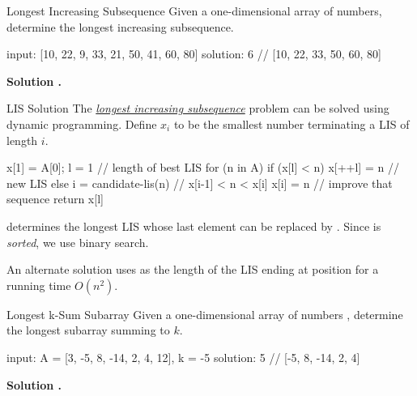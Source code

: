 \documentclass{cognito}
\begin{document}
\begin{note}{Longest Increasing Subsequence}
	Given a one-dimensional array of numbers, determine the longest increasing subsequence.
	\begin{largecode}
 input: [10, 22, 9, 33, 21, 50, 41, 60, 80]
 solution: 6  // [10, 22, 33, 50, 60, 80]
	\end{largecode}	
	
	\bf Solution \hyperref[note:LIS Solution]{\solutionref}.
\end{note}

\begin{note}{LIS Solution}
	The \hyperref[note:Longest Increasing Subsequence]{\it longest increasing subsequence} problem can be solved
	using dynamic programming. Define $x_i$ to be the smallest number terminating a LIS of length $i$.
	\begin{largecode}
 x[1] = A[0];  l = 1          // length of best LIS
 for (n in A)
 	if (x[l] < n) x[++l] = n  // new LIS
	else
		i = candidate-lis(n)  // x[i-1] < n < x[i]
		x[i] = n              // improve that sequence
 return x[l]
	\end{largecode}
	 determines the longest LIS whose last element can be replaced by .
	Since  is \emph{sorted}, we use binary search.
	\begin{remark} An alternate solution uses  as the length of the LIS ending at position  for a running time $O(n^2)$.\end{remark} \vspace{-5pt}
\end{note}

\begin{note}{Longest k-Sum Subarray}
	Given a one-dimensional array of numbers , determine the longest subarray  summing to $k$.
	\begin{largecode}
 input: A = [3, -5, 8, -14, 2, 4, 12], k = -5
 solution: 5  // [-5, 8, -14, 2, 4]
	\end{largecode}	
	
	\bf Solution \hyperref[note:Longest k-Sum Subarray Solution]{\solutionref}.
\end{note}
\end{document}

